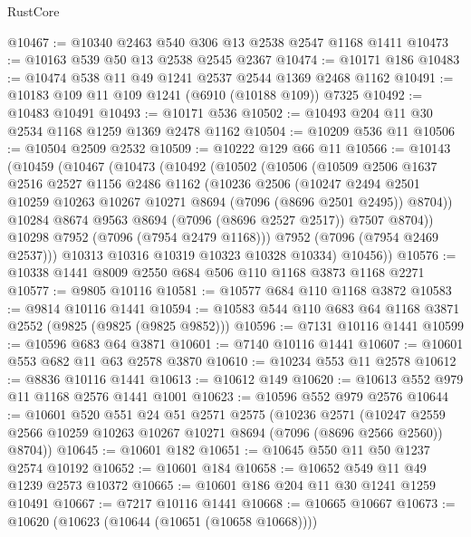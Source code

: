 \begin{lexlean}{RustCore}
\begin{coremodule}
@10467 := @10340 @2463 @540 @306 @13 @2538 @2547 @1168 @1411
@10473 := @10163 @539 @50 @13 @2538 @2545 @2367
@10474 := @10171 @186
@10483 := @10474 @538 @11 @49 @1241 @2537 @2544 @1369 @2468 @1162
@10491 := @10183 @109 @11 @109 @1241 (@6910 (@10188 @109)) @7325
@10492 := @10483 @10491
@10493 := @10171 @536
@10502 := @10493 @204 @11 @30 @2534 @1168 @1259 @1369 @2478 @1162
@10504 := @10209 @536 @11
@10506 := @10504 @2509 @2532
@10509 := @10222 @129 @66 @11
@10566 := @10143
    (@10459
      (@10467
        (@10473
          (@10492
            (@10502
              (@10506
                (@10509
                  @2506
                  @1637
                  @2516
                  @2527
                  @1156
                  @2486
                  @1162
                  (@10236
                    @2506
                    (@10247
                      @2494
                      @2501
                      @10259
                      @10263
                      @10267
                      @10271
                      @8694
                      (@7096 (@8696 @2501 @2495))
                      @8704))
                  @10284
                  @8674
                  @9563
                  @8694
                  (@7096 (@8696 @2527 @2517))
                  @7507
                  @8704))
              @10298
              @7952
              (@7096 (@7954 @2479 @1168)))
            @7952
            (@7096 (@7954 @2469 @2537)))
          @10313
          @10316
          @10319
          @10323
          @10328
          @10334)
        @10456))
@10576 := @10338 @1441 @8009 @2550 @684 @506 @110 @1168 @3873 @1168 @2271
@10577 := @9805 @10116
@10581 := @10577 @684 @110 @1168 @3872
@10583 := @9814 @10116 @1441
@10594 := @10583 @544 @110 @683 @64 @1168 @3871 @2552 (@9825 (@9825 (@9825 @9852)))
@10596 := @7131 @10116 @1441
@10599 := @10596 @683 @64 @3871
@10601 := @7140 @10116 @1441
@10607 := @10601 @553 @682 @11 @63 @2578 @3870
@10610 := @10234 @553 @11 @2578
@10612 := @8836 @10116 @1441
@10613 := @10612 @149
@10620 := @10613 @552 @979 @11 @1168 @2576 @1441 @1001
@10623 := @10596 @552 @979 @2576
@10644 := @10601
    @520
    @551
    @24
    @51
    @2571
    @2575
    (@10236
      @2571
      (@10247 @2559 @2566 @10259 @10263 @10267 @10271 @8694 (@7096 (@8696 @2566 @2560)) @8704))
@10645 := @10601 @182
@10651 := @10645 @550 @11 @50 @1237 @2574 @10192
@10652 := @10601 @184
@10658 := @10652 @549 @11 @49 @1239 @2573 @10372
@10665 := @10601 @186 @204 @11 @30 @1241 @1259 @10491
@10667 := @7217 @10116 @1441
@10668 := @10665 @10667
@10673 := @10620 (@10623 (@10644 (@10651 (@10658 @10668))))

\end{coremodule}
\end{lexlean}
